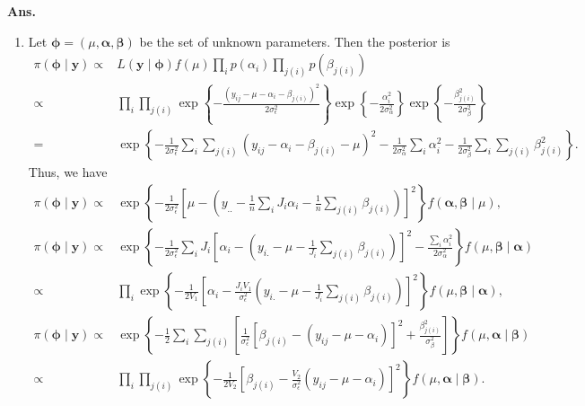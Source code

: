 \documentclass[11pt]{article}
\begin{document}
\textbf{Ans.}
\begin{enumerate}
    \item Let $\boldsymbol{\phi}=(\mu,\boldsymbol{\alpha},\boldsymbol{\beta})$ be the set of unknown parameters. Then the posterior is
    \begin{align*}
        \pi(\boldsymbol{\phi\mid \mathbf{y}})
        \propto& L(\mathbf{y}\mid\boldsymbol{\phi}) f(\mu) \prod_{i} p(\alpha_i) \prod_{j(i)} p(\beta_{j(i)})\\
        \propto&\prod_{i} \prod_{j(i)} \exp\left\{ -\frac{(y_{ij}-\mu-\alpha_i-\beta_{j(i)})^2}{2 \sigma_\epsilon ^2} \right\} \exp\left\{ -\frac{\alpha_i^2}{2\sigma_\alpha^2} \right\} \exp\left\{ -\frac{\beta_{j(i)}^2}{2\sigma_\beta^2} \right\} \\
        =&\exp \left\{ -\frac{1}{2\sigma_\epsilon^2}\sum\limits_{i} \sum\limits_{j(i)}\left( y_{ij}-\alpha_i-\beta_{j(i)}-\mu \right)^2 -\frac{1}{2\sigma_\alpha^2}\sum\limits_{i}\alpha_i^2 -\frac{1}{2\sigma_\beta^2}\sum\limits_{i}\sum\limits_{j(i)}\beta_{j(i)}^2  \right\}.
    \end{align*}
    Thus, we have
    \begin{align*}
        \pi(\boldsymbol{\phi\mid \mathbf{y}})
        \propto& \exp\left\{ -\frac{1}{2\sigma_\epsilon^2} \left[ \mu-\left( y_{..}-\frac{1}{n}\sum\limits_{i}J_i\alpha_i-\frac{1}{n}\sum\limits_{j(i)}\beta_{j(i)} \right) \right]^2 \right\} f(\boldsymbol{\alpha},\boldsymbol{\beta}\mid \mu),\\
        \pi(\boldsymbol{\phi\mid \mathbf{y}})        
        \propto& \exp \left\{ -\frac{1}{2\sigma_\epsilon^2}\sum\limits_{i}J_i\left[ \alpha_i-\left(y_{i.}-\mu-\frac{1}{J_{i}} \sum_{j(i)} \beta_{j(i)}\right) \right]^2 -\frac{\sum_{i}\alpha_i^2}{2\sigma_\alpha^2 }\right\} f(\mu,\boldsymbol{\beta}\mid \boldsymbol{\alpha})\\
        \propto& \prod_{i}\exp\left\{ -\frac{1}{2V_1} \left[ \alpha_i-\frac{J_{i} V_{1}}{\sigma_{\epsilon}^{2}}\left(y_{i.}-\mu-\frac{1}{J_{i}} \sum_{j(i)} \beta_{j(i)}\right) \right]^2  \right\} f(\mu,\boldsymbol{\beta}\mid \boldsymbol{\alpha}),\\
        \pi(\boldsymbol{\phi\mid \mathbf{y}})
        \propto&\exp\left\{ -\frac{1}{2}\sum\limits_{i} \sum\limits_{j(i)}\left[  \frac{1}{\sigma_\epsilon^2} \left[ \beta_{j(i)}-\left(y_{i j}-\mu-\alpha_{i}\right) \right]^2+\frac{\beta_{j(i)}^2}{\sigma_\beta^2} \right] \right\}  f(\mu,\boldsymbol{\alpha}\mid \boldsymbol{\beta})\\
        \propto& \prod_i\prod_{j(i)} \exp\left\{ -\frac{1}{2V_2} \left[ \beta_{j(i)}-\frac{V_{2}}{\sigma_{\epsilon}^{2}}\left(y_{i j}-\mu-\alpha_{i}\right) \right]^2 \right\} f(\mu,\boldsymbol{\alpha}\mid \boldsymbol{\beta}).

\end{align*}
\end{enumerate}
\end{document}
